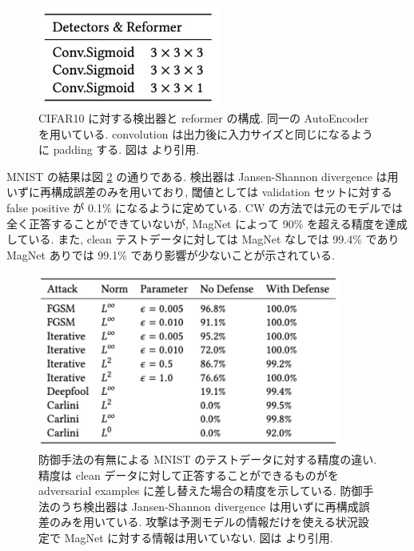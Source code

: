 \begin{figure}[htbp]
\begin{center}
\includegraphics[width=6.0cm]{figures/magnet-model-cifar10.pdf}
\end{center}
\caption{
CIFAR10 に対する検出器と reformer の構成.
同一の AutoEncoder を用いている.
convolution は出力後に入力サイズと同じになるように padding する.
図は \cite{meng2017magnet} より引用.
}
\label{fig:magnet-cifar10}
\end{figure}


MNIST の結果は図 \ref{fig:magnet-result-mnist} の通りである.
検出器は Jansen-Shannon divergence は用いずに再構成誤差のみを用いており, 閾値としては validation セットに対する false positive が 0.1\% になるように定めている.
CW の方法では元のモデルでは全く正答することができていないが, MagNet によって 90\% を超える精度を達成している.
また, clean テストデータに対しては MagNet なしでは 99.4\% であり MagNet ありでは 99.1\% であり影響が少ないことが示されている.
%
\begin{figure}[htbp]
\begin{center}
\includegraphics[width=10.0cm]{figures/magnet-result-mnist.pdf}
\end{center}
\caption{
防御手法の有無による MNIST のテストデータに対する精度の違い.
精度は clean データに対して正答することができるものがを adversarial examples に差し替えた場合の精度を示している.
防御手法のうち検出器は Jansen-Shannon divergence は用いずに再構成誤差のみを用いている.
攻撃は予測モデルの情報だけを使える状況設定で MagNet に対する情報は用いていない.
図は \cite{meng2017magnet} より引用.
}
\label{fig:magnet-result-mnist}
\end{figure}
%

